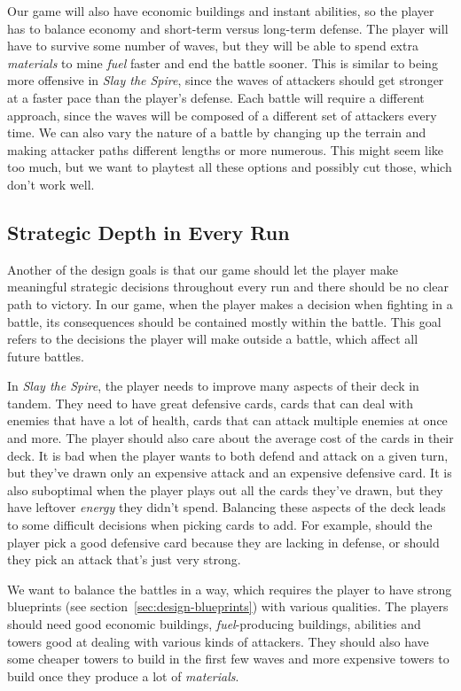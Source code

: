 Our game will also have economic buildings and instant abilities, so the player has to balance economy and short-term versus long-term defense.
The player will have to survive some number of waves, but they will be able to spend extra \emph{materials} to mine \emph{fuel} faster and end the battle sooner.
This is similar to being more offensive in \emph{Slay the Spire}, since the waves of attackers should get stronger at a faster pace than the player's defense.
Each battle will require a different approach, since the waves will be composed of a different set of attackers every time.
We can also vary the nature of a battle by changing up the terrain and making attacker paths different lengths or more numerous.
This might seem like too much, but we want to playtest all these options and possibly cut those, which don't work well.

\subsection{Strategic Depth in Every Run} \label{sec:goal-depth-run}

Another of the design goals is that our game should let the player make meaningful strategic decisions throughout every run and there should be no clear path to victory.
In our game, when the player makes a decision when fighting in a battle, its consequences should be contained mostly within the battle.
This goal refers to the decisions the player will make outside a battle, which affect all future battles.

In \emph{Slay the Spire}, the player needs to improve many aspects of their deck in tandem.
They need to have great defensive cards, cards that can deal with enemies that have a lot of health, cards that can attack multiple enemies at once and more.
The player should also care about the average cost of the cards in their deck.
It is bad when the player wants to both defend and attack on a given turn, but they've drawn only an expensive attack and an expensive defensive card.
It is also suboptimal when the player plays out all the cards they've drawn, but they have leftover \emph{energy} they didn't spend.
Balancing these aspects of the deck leads to some difficult decisions when picking cards to add.
For example, should the player pick a good defensive card because they are lacking in defense, or should they pick an attack that's just very strong.

We want to balance the battles in a way, which requires the player to have strong blueprints (see section~\ref{sec:design-blueprints}) with various qualities.
The players should need good economic buildings, \emph{fuel}-producing buildings, abilities and towers good at dealing with various kinds of attackers.
They should also have some cheaper towers to build in the first few waves and more expensive towers to build once they produce a lot of \emph{materials}.

